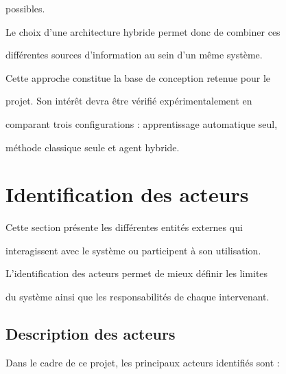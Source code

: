 possibles.



Le choix d'une architecture hybride permet donc de combiner ces

différentes sources d'information au sein d'un même système.



Cette approche constitue la base de conception retenue pour le

projet. Son intérêt devra être vérifié expérimentalement en

comparant trois configurations : apprentissage automatique seul,

méthode classique seule et agent hybride.





\section{Identification des acteurs}



Cette section présente les différentes entités externes qui

interagissent avec le système ou participent à son utilisation.

L'identification des acteurs permet de mieux définir les limites

du système ainsi que les responsabilités de chaque intervenant.



\subsection{Description des acteurs}



Dans le cadre de ce projet, les principaux acteurs identifiés sont :



